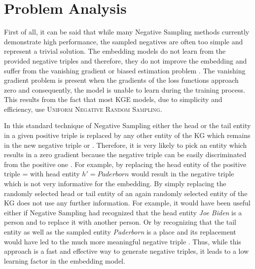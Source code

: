 \section{Problem Analysis}
\label{sec:problem_analysis}

First of all, it can be said that while many Negative Sampling methods currently demonstrate high performance, the sampled negatives are often too simple and represent a trivial solution. 
The embedding models do not learn from the provided negative triples and therefore, they do not improve the embedding and suffer from the vanishing gradient or biased estimation problem \cite{zhang2021efficient}.
The vanishing gradient problem is present when the gradients of the loss functions approach zero and consequently, the model is unable to learn during the training process.
This results from the fact that most \ac{KGE} models, due to simplicity and efficiency, use \textsc{Uniform Negative Random Sampling}.

In this standard technique of Negative Sampling either the head or the tail entity in a given positive triple  is replaced by any other entity of the \ac{KG} which remains in the new negative triple  or . 
Therefore, it is very likely to pick an entity which results in a zero gradient because the negative triple can be easily discriminated from the positive one \cite{cai2017kbgan}.
For example, by replacing the head entity of the positive triple  =  with head entity $h' = Paderborn$ would result in the negative triple  which is not very informative for the embedding.
By simply replacing the randomly selected head or tail entity of an again randomly selected entity of the \ac{KG} does not use any further information.
For example, it would have been useful either if Negative Sampling had recognized that the head entity \textit{Joe Biden} is a person and to replace it with another person.
Or by recognizing that the tail entity as well as the sampled entity \textit{Paderborn} is a place and its replacement would have led to the much more meaningful negative triple .  
Thus, while this approach is a fast and effective way to generate negative triples, it leads to a low learning factor in the embedding model.

